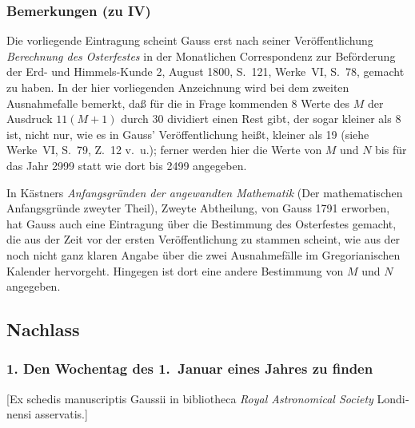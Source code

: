 \documentclass[12pt,a4paper]{article}
\theoremstyle{plain}
\theoremstyle{definition}
\theoremstyle{remark}
\begin{document}
\newpage

\subsubsection*{Bemerkungen (zu IV)}

Die vorliegende Eintragung scheint Gauss erst nach seiner Veröffentlichung \textit{Berechnung des Osterfestes} in der Monatlichen Correspondenz zur Beförderung der Erd- und Himmels-Kunde 2, August 1800, S.~121, Werke~VI, S.~78, gemacht zu haben. In der hier vorliegenden Anzeichnung wird bei dem zweiten Ausnahmefalle bemerkt, daß für die in Frage kommenden 8 Werte des $M$ der Ausdruck $11(M + 1)$ durch 30 dividiert einen Rest gibt, der sogar kleiner als 8 ist, nicht nur, wie es in Gauss' Veröffentlichung heißt, kleiner als 19 (siehe Werke~VI, S.~79, Z.~12 v.~u.); ferner werden hier die Werte von $M$ und $N$ bis für das Jahr 2999 statt wie dort bis 2499 angegeben.

In Kästners \textit{Anfangsgründen der angewandten Mathematik} (Der mathematischen Anfangsgründe zweyter Theil), Zweyte Abtheilung, von Gauss 1791 erworben, hat Gauss auch eine Eintragung über die Bestimmung des Osterfestes gemacht, die aus der Zeit vor der ersten Veröffentlichung zu stammen scheint, wie aus der noch nicht ganz klaren Angabe über die zwei Ausnahmefälle im Gregorianischen Kalender hervorgeht. Hingegen ist dort eine andere Bestimmung von $M$ und $N$ angegeben.

\newpage

\subsection*{Nachlass}

\subsubsection*{1. Den Wochentag des 1.~Januar eines Jahres zu finden}

\begin{otherlanguage}{latin}
[Ex schedis manuscriptis Gaussii in bibliotheca \textit{Royal Astronomical Society} Londinensi asservatis.]
\end{otherlanguage}
\end{document}
